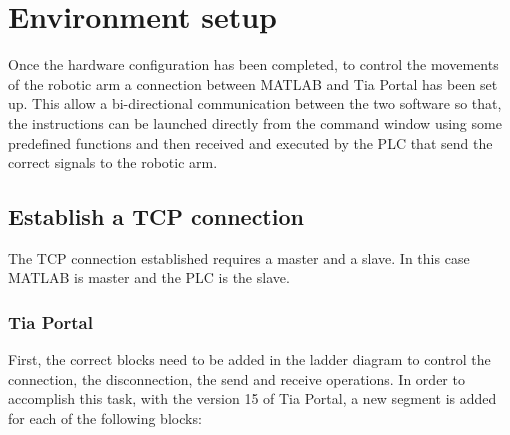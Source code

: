 \newpage
\section{Environment setup}

Once the hardware configuration has been completed, to control the movements of the robotic arm a connection between MATLAB and Tia Portal has been set up. This allow a bi-directional communication between the two software so that, the instructions can be launched directly from the command window using some predefined functions and then received and executed by the PLC that send the correct signals to the robotic arm.

\subsection{Establish a TCP connection}

 The TCP connection established requires a master and a slave. In this case MATLAB is master and the PLC is the slave.  
 
\subsubsection{Tia Portal}
First, the correct blocks need to be added in the ladder diagram to control the connection, the disconnection, the send and receive operations. In order to accomplish this task, with the version 15 of Tia Portal, a new segment is added for each of the following blocks:

